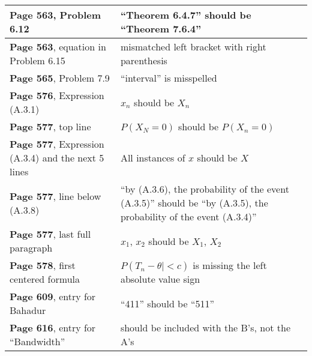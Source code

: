 \documentclass[10pt, a4paper]{article}
\begin{document}
\begin{longtable}{|R{.40\textwidth}|R{.55\textwidth}|}
\textbf{Page 563}, Problem 6.12 & ``Theorem 6.4.7'' should be ``Theorem 7.6.4'' \\ \hline
\textbf{Page 563}, equation in Problem 6.15 & mismatched left bracket with right parenthesis \\ \hline
\textbf{Page 565}, Problem 7.9 & ``interval'' is misspelled \\ \hline
\textbf{Page 576}, Expression (A.3.1) & $x_n$ should be $X_n$ \\ \hline
\textbf{Page 577}, top line & $P(X_N = 0)$ should be $P(X_n = 0)$ \\ \hline
\textbf{Page 577}, Expression (A.3.4) and the next 5 lines & All instances of $x$ should be $X$ \\ \hline
\textbf{Page 577}, line below (A.3.8) & ``by (A.3.6), the probability of the event (A.3.5)'' should be ``by (A.3.5), the probability of the event (A.3.4)'' \\ \hline
\textbf{Page 577}, last full paragraph & $x_1$, $x_2$ should be $X_1$, $X_2$ \\ \hline
\textbf{Page 578}, first centered formula & $P(T_n - \theta| < c)$ is missing the left absolute value sign \\ \hline
\textbf{Page 609}, entry for Bahadur & ``411'' should be ``511'' \\ \hline
\textbf{Page 616}, entry for ``Bandwidth'' & should be included with the B's, not the A's \\ \hline
\end{longtable}
\end{document}
